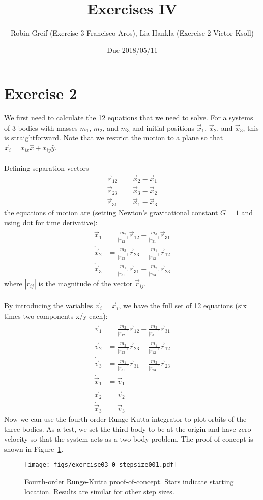 \documentclass[12pt,a4paper,twoside]{article}
\title{Exercises IV}
\author{Robin Greif (Exercise 3 Francisco Aros), Lia Hankla (Exercise 2 Victor Ksoll)}
\date{Due 2018/05/11}
\begin{document}
\maketitle

\section*{Exercise 2}
We first need to calculate the 12 equations that we need to solve. For a systems of 3-bodies with masses $m_1$, $m_2$, and $m_3$ and initial positions $\vec x_1$, $\vec x_2$, and $\vec x_3$, this is straightforward. Note that we restrict the motion to a plane so that $\vec x_i = x_{ix}\hat x + x_{iy}\hat y$.\\
\\
Defining separation vectors
\begin{align*}
  \vec r_{12} &= \vec x_2 - \vec x_1\\
  \vec r_{23} &= \vec x_3 - \vec x_2\\
  \vec r_{31} &= \vec x_1 - \vec x_3
\end{align*}
the equations of motion are (setting Newton's gravitational constant $G=1$ and using dot for time derivative):
\begin{align*}
  \ddot{\vec x}_1 &= \frac{m_2}{|r_{12}|^3}\vec r_{12}-\frac{m_3}{|r_{31}|^3}\vec r_{31}\\
  \ddot {\vec x}_2 &= \frac{m_3}{|r_{23}|^3}\vec r_{23}-\frac{m_1}{|r_{12}|^3}\vec r_{12}\\
  \ddot {\vec x}_3 &= \frac{m_1}{|r_{31}|^3}\vec r_{31}-\frac{m_2}{|r_{23}|^3}\vec r_{23}
\end{align*}
where $|r_{ij}|$ is the magnitude of the vector $\vec r_{ij}$.\\
\\
By introducing the variables $\vec v_{i} = \dot{\vec x}_i$, we have the full set of 12 equations (six times two components x/y each):
\begin{align*}
  \dot {\vec v}_1 &= \frac{m_2}{|r_{12}|^3}\vec r_{12}-\frac{m_3}{|r_{31}|^3}\vec r_{31}\\
  \dot {\vec v}_2 &= \frac{m_3}{|r_{23}|^3}\vec r_{23}-\frac{m_1}{|r_{12}|^3}\vec r_{12}\\
  \dot {\vec v}_3 &= \frac{m_1}{|r_{31}|^3}\vec r_{31}-\frac{m_2}{|r_{23}|^3}\vec r_{23}\\
  \dot {\vec x}_1 &= \vec v_1\\
  \dot {\vec x}_2 &= \vec v_2\\
  \dot {\vec x}_3 &= \vec v_3
\end{align*}
Now we can use the fourth-order Runge-Kutta integrator to plot orbits of the three bodies. As a test, we set the third body to be at the origin and have zero velocity so that the system acts as a two-body problem. The proof-of-concept is shown in Figure~\ref{fig:circ}.
\begin{figure}[h!]
  \centering
  \texttt{[image: figs/exercise03\_0\_stepsize001.pdf]}
  \caption{Fourth-order Runge-Kutta proof-of-concept. Stars indicate starting location. Results are similar for other step sizes.} \label{fig:circ}
\end{figure}
\end{document}
